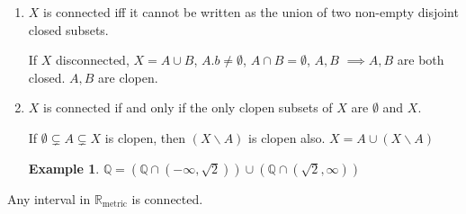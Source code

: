 \documentclass[twoside]{article}
\newcommand{\Q}{\mathbb{Q}}
\newtheorem{example}[theorem]{Example}
\newcommand\R{\mathbb{R}}
\begin{document}
\begin{enumerate}
    \item $X$ is connected iff it cannot be written as the union of two non-empty disjoint closed subsets. 

    If $X$ disconnected, $X = A \cup B$, $A. b \neq \emptyset$, $A \cap B = \emptyset$, $A, B$ $\implies A, B$ are both closed. $A, B$ are clopen.
    
    \item $X$ is connected if and only if the only clopen subsets of $X$ are $\emptyset$ and $X$. 

    If $\emptyset \subsetneq A \subsetneq X$ is clopen, then $(X\backslash A)$ is clopen also. $X = A \cup (X \backslash A)$

    \begin{example}
        $\Q = (\Q \cap (-\infty, \sqrt2)) \cup (\Q \cap (\sqrt2, \infty)) $
    \end{example}
\end{enumerate}

\newcommand{\Rm}{\R_{\text{metric}}}
\newcommand{\ep}{\varepsilon}

Any interval in $\R_{\text{metric}}$ is connected. 
\end{document}

